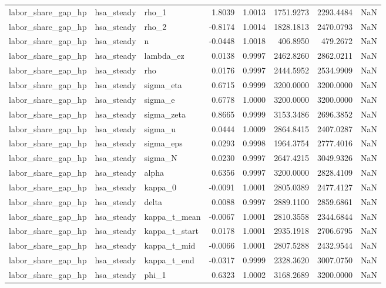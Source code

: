 \begin{tabular}{lllrrrrl}
labor\_share\_gap\_hp & hsa\_steady & rho\_1 & 1.8039 & 1.0013 & 1751.9273 & 2293.4484 & NaN \\
labor\_share\_gap\_hp & hsa\_steady & rho\_2 & -0.8174 & 1.0014 & 1828.1813 & 2470.0793 & NaN \\
labor\_share\_gap\_hp & hsa\_steady & n & -0.0448 & 1.0018 & 406.8950 & 479.2672 & NaN \\
labor\_share\_gap\_hp & hsa\_steady & lambda\_ez & 0.0138 & 0.9997 & 2462.8260 & 2862.0211 & NaN \\
labor\_share\_gap\_hp & hsa\_steady & rho & 0.0176 & 0.9997 & 2444.5952 & 2534.9909 & NaN \\
labor\_share\_gap\_hp & hsa\_steady & sigma\_eta & 0.6715 & 0.9999 & 3200.0000 & 3200.0000 & NaN \\
labor\_share\_gap\_hp & hsa\_steady & sigma\_e & 0.6778 & 1.0000 & 3200.0000 & 3200.0000 & NaN \\
labor\_share\_gap\_hp & hsa\_steady & sigma\_zeta & 0.8665 & 0.9999 & 3153.3486 & 2696.3852 & NaN \\
labor\_share\_gap\_hp & hsa\_steady & sigma\_u & 0.0444 & 1.0009 & 2864.8415 & 2407.0287 & NaN \\
labor\_share\_gap\_hp & hsa\_steady & sigma\_eps & 0.0293 & 0.9998 & 1964.3754 & 2777.4016 & NaN \\
labor\_share\_gap\_hp & hsa\_steady & sigma\_N & 0.0230 & 0.9997 & 2647.4215 & 3049.9326 & NaN \\
labor\_share\_gap\_hp & hsa\_steady & alpha & 0.6356 & 0.9997 & 3200.0000 & 2828.4109 & NaN \\
labor\_share\_gap\_hp & hsa\_steady & kappa\_0 & -0.0091 & 1.0001 & 2805.0389 & 2477.4127 & NaN \\
labor\_share\_gap\_hp & hsa\_steady & delta & 0.0088 & 0.9997 & 2889.1100 & 2859.6861 & NaN \\
labor\_share\_gap\_hp & hsa\_steady & kappa\_t\_mean & -0.0067 & 1.0001 & 2810.3558 & 2344.6844 & NaN \\
labor\_share\_gap\_hp & hsa\_steady & kappa\_t\_start & 0.0178 & 1.0001 & 2935.1918 & 2706.6795 & NaN \\
labor\_share\_gap\_hp & hsa\_steady & kappa\_t\_mid & -0.0066 & 1.0001 & 2807.5288 & 2432.9544 & NaN \\
labor\_share\_gap\_hp & hsa\_steady & kappa\_t\_end & -0.0317 & 0.9999 & 2328.3620 & 3007.0750 & NaN \\
labor\_share\_gap\_hp & hsa\_steady & phi\_1 & 0.6323 & 1.0002 & 3168.2689 & 3200.0000 & NaN \\

\end{tabular}
